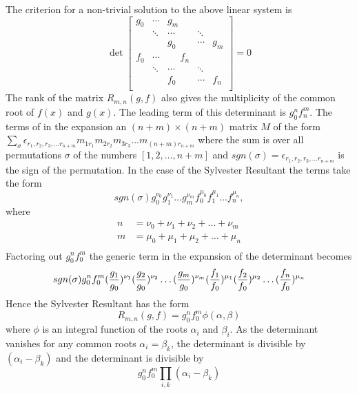 The criterion for a non-trivial solution to the above linear system is 
\[
\det \begin{bmatrix}
g_0 & \cdots & g_m & & \\
&\ddots & \cdots & \ddots & \\
& & g_0 & \cdots & g_m \\
f_0 & \cdots & ~~~~~~f_n & & \\
&\ddots & \cdots & \ddots & \\
& &f_0 & \cdots &f_n \\
\end{bmatrix} = 0\]
The rank of the matrix $R_{m,n}(g,f)$ also gives the multiplicity of the common root of $f(x)$ and $g(x)$.
The leading term of this determinant is $g_0^n f_n^m$. The terms of in the expansion an $(n + m) \times (n+m)$ matrix $M$  of the form
$\sum_{\sigma}\epsilon_{r_1,r_2,r_3,\hdots r_{n+m}} m_{1r_1} m_{2r_2} m_{3r_3}  \hdots m_{(n+m) r_{n+m}} $ where the sum is over all permutations $\sigma$ of the numbers $[1,2,\hdots,n+m]$ and 
$sgn(\sigma) = \epsilon_{r_1,r_2,r_3,\hdots r_{n+m}} $ is the sign of the permutation. In the case of the Sylvester Resultant the terms take the form 
\[sgn(\sigma) g_0^{\nu_0}g_1^{\nu_1}\hdots g_m^{\nu_m} f_0^{\mu_0} f_1^{\mu_1} \hdots f_n^{\mu_n},\]
where 
\begin{align*}
n &=  \nu_0 + \nu_1   +   \nu_2 + \hdots  + \nu_m \\ 
m & =  \mu_0 + \mu_1  +  \mu_2 + \hdots  + \mu_n \\
\end{align*}
Factoring out $g_0^n f_0^m$ the generic term in the expansion of the determinant becomes
\[sgn(\sigma) g_0^n f_0^m  ( {g_1\over g_0})^{\nu_1} ({g_2\over g_0})^{\nu_2} \hdots ({g_m \over g_0})^{\nu_m}  ({f_1\over f_0})^{\mu_1} ({f_2\over f_0})^{\mu_2} \hdots ({f_n\over f_0})^{\mu_n} \]
Hence the Sylvester Resultant has the form 
\[ R_{m,n}(g,f) = g_0^n f_0^m \phi(\alpha,\beta) \] where $\phi$ is an integral function of the roots $\alpha_i$ and $\beta_i$.
As the determinant vanishes for any common roots $\alpha_i = \beta_k$, the determinant is divisible by $(\alpha_i - \beta_k)$ and the determinant is divisible by 
\[ g_0^n f_0^m \prod_{i,k} (\alpha_i - \beta_k) \]

